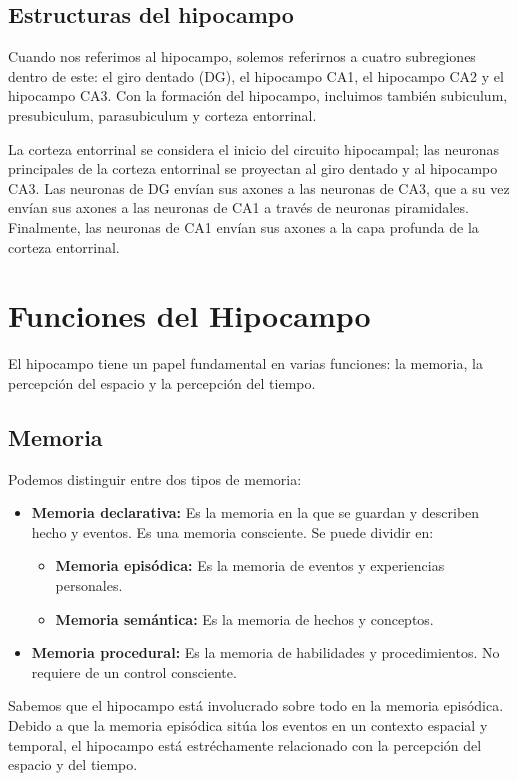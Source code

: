 \documentclass[12pt, letterpaper]{article}
\begin{document}
\subsection{Estructuras del hipocampo}
Cuando nos referimos al hipocampo, solemos referirnos a cuatro subregiones dentro de este: el giro dentado (DG), el hipocampo CA1, el hipocampo CA2 y el hipocampo CA3. Con la formación del hipocampo, incluimos también subiculum, presubiculum, parasubiculum y corteza entorrinal. 

La corteza entorrinal se considera el inicio del circuito hipocampal; las neuronas principales de la corteza entorrinal se proyectan al giro dentado y al hipocampo CA3. Las neuronas de DG envían sus axones a las neuronas de CA3, que a su vez envían sus axones a las neuronas de CA1 a través de neuronas piramidales. Finalmente, las neuronas de CA1 envían sus axones a la capa profunda de la corteza entorrinal.


\section{Funciones del Hipocampo}
El hipocampo tiene un papel fundamental en varias funciones: la memoria, la percepción del espacio y la percepción del tiempo. 

\subsection{Memoria}
Podemos distinguir entre dos tipos de memoria:
\begin{itemize}
    \item \textbf{Memoria declarativa:} Es la memoria en la que se guardan y describen hecho y eventos. Es una memoria consciente. Se puede dividir en:
    \begin{itemize}
        \item \textbf{Memoria episódica:} Es la memoria de eventos y experiencias personales.
        \item \textbf{Memoria semántica:} Es la memoria de hechos y conceptos.
    \end{itemize}
    \item \textbf{Memoria procedural:} Es la memoria de habilidades y procedimientos. No requiere de un control consciente.
\end{itemize}

Sabemos que el hipocampo está involucrado sobre todo en la memoria episódica. Debido a que la memoria episódica sitúa los eventos en un contexto espacial y temporal, el hipocampo está estréchamente relacionado con la percepción del espacio y del tiempo.
\end{document}
